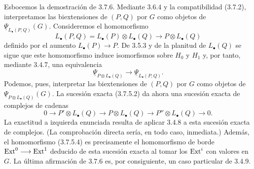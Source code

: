 Esbocemos la demostración de 3.7.6. Mediante 3.6.4 y la compatibilidad
(3.7.2), interpretamos las biextensiones de $(P,Q)$ por $G$ como
objetos de $\underline\Psi_{L_\bullet(P,Q)}(G)$. Consideremos el
homomorfismo
\[
 L_\bullet(P,Q)
 =L_\bullet(P)\otimes L_\bullet(Q)
 \longrightarrow P\otimes L_\bullet(Q)
\]
definido por el aumento $L_\bullet(P)\longrightarrow P$. De 3.5.3 y
de la planitud de $L_\bullet(Q)$ se sigue que este homomorfismo induce
isomorfismos sobre $H_0$ y $H_1$ y, por tanto, mediante 3.4.7, una
equivalencia
\[
 \underline\Psi_{P\otimes L_\bullet(Q)}
 \longrightarrow
 \underline\Psi_{L_\bullet(P,Q)}.
\]
Podemos, pues, interpretar las biextensiones de $(P,Q)$ por $G$ como
objetos de $\underline\Psi_{P\otimes L_\bullet(Q)}(G)$. La sucesión
exacta (3.7.5.2) da ahora una sucesión exacta de complejos de cadenas
\begin{equation}\tag{3.7.6.1}
 0\longrightarrow P'\otimes L_\bullet(Q)
 \longrightarrow P\otimes L_\bullet(Q)
 \longrightarrow P''\otimes L_\bullet(Q)
 \longrightarrow0.
\end{equation}
La exactitud a izquierda enunciada resulta de aplicar 3.4.8 a esta
sucesión exacta de complejos. (La comprobación directa sería, en todo
caso, inmediata.) Además, el homomorfismo (3.7.5.4) es precisamente el
homomorfismo de borde $\operatorname{Ext}^0\longrightarrow\operatorname{Ext}^1$ deducido de esta
sucesión exacta al tomar los $\operatorname{Ext}^i$ con valores en $G$. La última
afirmación de 3.7.6 es, por consiguiente, un caso particular de 3.4.9.
